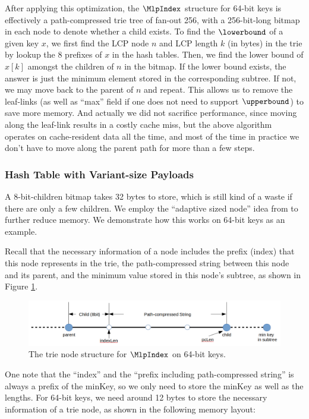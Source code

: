 \documentclass[11pt, usletter]{article}
\begin{document}
After applying this optimization, the $\MlpIndex$ structure for 64-bit keys is effectively 
a path-compressed trie tree of fan-out 256, with a 256-bit-long bitmap in each node to denote whether a child exists. 
To find the $\lowerbound$ of a given key $x$, we first find the LCP node $n$ and LCP length $k$ (in bytes) in the trie 
by lookup the 8 prefixes of $x$ in the hash tables. 
Then, we find the lower bound of $x[k]$ amongst the children of $n$ in the bitmap. 
If the lower bound exists, the answer is just the minimum element stored in the corresponding subtree.
If not, we may move back to the parent of $n$ and repeat. 
This allows us to remove the leaf-links (as well as ``max'' field if one does not need to support $\upperbound$) to save more memory. 
And actually we did not sacrifice performance, since moving along the leaf-link results in a costly cache miss, 
but the above algorithm operates on cache-resident data all the time, and most of the time in practice 
we don't have to move along the parent path for more than a few steps.

\subsubsection*{Hash Table with Variant-size Payloads}

A 8-bit-children bitmap takes 32 bytes to store, which is still kind of a waste if there are only a few children. 
We employ the ``adaptive sized node'' idea from \cite{arttrie_icde13} to further reduce memory. 
We demonstrate how this works on 64-bit keys as an example. 

Recall that the necessary information of a node includes the prefix (index) that this node represents in the trie, 
the path-compressed string between this node and its parent, and the minimum value stored in this node's subtree, 
as shown in Figure \ref{mlpindex64_node}.

\begin{figure}[!htb]
  \includegraphics[width=\linewidth]{mlpindex64_node.png}
\caption{The trie node structure for $\MlpIndex$ on 64-bit keys.}
\label{mlpindex64_node}
\end{figure}

One note that the ``index'' and the ``prefix including path-compressed string'' is always a prefix of the minKey, 
so we only need to store the minKey as well as the lengths. 
For 64-bit keys, we need around 12 bytes to store the necessary information of a trie node, 
as shown in the following memory layout:
\end{document}
